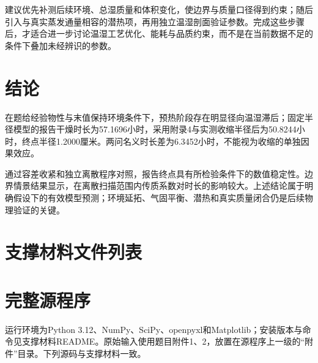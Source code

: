 \documentclass[UTF8,zihao=-4,a4paper]{ctexart}
\begin{document}
建议优先补测后续环境、总湿质量和体积变化，使边界与质量口径得到约束；随后引入与真实蒸发通量相容的潜热项，再用独立温湿剖面验证参数。完成这些步骤后，才适合进一步讨论温湿工艺优化、能耗与品质约束，而不是在当前数据不足的条件下叠加未经辨识的参数。
\section{结论}
在题给经验物性与末值保持环境条件下，预热阶段存在明显径向温湿滞后；固定半径模型的报告干燥时长为57.1696小时，采用附录4与实测收缩半径后为50.8244小时，终点半径1.2000厘米。两问名义时长差为6.3452小时，不能视为收缩的单独因果效应。

通过容差收紧和独立离散程序对照，报告终点具有所检验条件下的数值稳定性。边界情景结果显示，在离散扫描范围内传质系数对时长的影响较大。上述结论属于明确假设下的有效模型预测；环境延拓、气固平衡、潜热和真实质量闭合仍是后续物理验证的关键。




\clearpage
\appendix
\section{支撑材料文件列表}

\section{完整源程序}
运行环境为Python 3.12、NumPy、SciPy、openpyxl和Matplotlib；安装版本与命令见支撑材料README。原始输入使用题目附件1、2，放置在源程序上一级的“附件”目录。下列源码与支撑材料一致。

\end{document}
